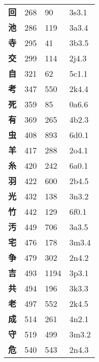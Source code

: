 \begin{longtable}[c]{llll}
    \bfseries 回 & 268 & 90 & 3s3.1\\
    \bfseries 池 & 286 & 119 & 3a3.4\\
    \bfseries 寺 & 295 & 41 & 3b3.5\\
    \bfseries 交 & 299 & 114 & 2j4.3\\
    \bfseries 自 & 321 & 62 & 5c1.1\\
    \bfseries 考 & 347 & 550 & 2k4.4\\
    \bfseries 死 & 359 & 85 & 0a6.6\\
    \bfseries 有 & 369 & 265 & 4b2.3\\
    \bfseries 虫 & 408 & 893 & 6d0.1\\
    \bfseries 羊 & 417 & 288 & 2o4.1\\
    \bfseries 糸 & 420 & 242 & 6a0.1\\
    \bfseries 羽 & 422 & 600 & 2b4.5\\
    \bfseries 光 & 432 & 138 & 3n3.2\\
    \bfseries 竹 & 442 & 129 & 6f0.1\\
    \bfseries 汚 & 449 & 706 & 3a3.5\\
    \bfseries 宅 & 476 & 178 & 3m3.4\\
    \bfseries 争 & 479 & 302 & 2n4.2\\
    \bfseries 吉 & 493 & 1194 & 3p3.1\\
    \bfseries 共 & 494 & 196 & 3k3.3\\
    \bfseries 老 & 497 & 552 & 2k4.5\\
    \bfseries 成 & 514 & 261 & 4n2.1\\
    \bfseries 守 & 519 & 499 & 3m3.2\\
    \bfseries 危 & 540 & 543 & 2n4.3\\
  \end{longtable}

